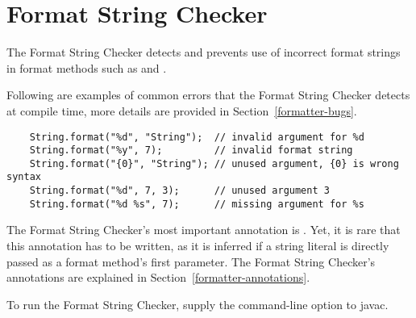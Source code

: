 \htmlhr
\chapter{Format String Checker\label{formatter-checker}}

The Format String Checker detects and prevents use of incorrect format strings
in format methods such as 
and .


% 
%
Following are examples of common errors that the Format String Checker detects at
compile time, more details are provided in Section~\ref{formatter-bugs}.

\begin{Verbatim}
    String.format("%d", "String");  // invalid argument for %d
    String.format("%y", 7);         // invalid format string
    String.format("{0}", "String"); // unused argument, {0} is wrong syntax
    String.format("%d", 7, 3);      // unused argument 3
    String.format("%d %s", 7);      // missing argument for %s
\end{Verbatim}

The Format String Checker's most important annotation is
. Yet, it is rare that this annotation
has to be written, as it is inferred if a string literal is directly passed as
a format method's first parameter. The Format String Checker's annotations are
explained in Section~\ref{formatter-annotations}.

To run the Format String Checker, supply the  command-line option to javac. 

